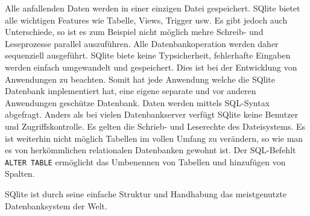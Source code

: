 Alle anfallenden Daten werden in einer einzigen Datei gespeichert. SQlite bietet alle wichtigen Features wie Tabelle, Views, Trigger usw. Es gibt jedoch auch Unterschiede, so ist es zum Beispiel nicht möglich mehre Schreib- und Leseprozesse parallel auszuführen. Alle Datenbankoperation werden daher sequenziell ausgeführt. SQlite biete keine Typsicherheit, fehlerhafte Eingaben werden einfach umgewandelt und gespeichert. Dies ist bei der Entwicklung von Anwendungen zu beachten. Somit hat jede Anwendung welche die SQlite Datenbank implementiert hat, eine eigene separate und vor anderen Anwendungen geschütze Datenbank. Daten werden mittels SQL-Syntax abgefragt. Anders als bei vielen Datenbankserver verfügt SQlite keine Benutzer und Zugriffskontrolle. Es gelten die Schrieb- und Leserechte des Dateisystems. Es ist weiterhin nicht möglich Tabellen im vollen Umfang zu verändern, so wie man es von herkömmlichen relationalen Datenbanken gewohnt ist. Der SQL-Befehlt \verb+ALTER TABLE+ ermöglicht das Umbenennen von Tabellen und hinzufügen von Spalten.

SQlite ist durch seine einfache Struktur und Handhabung das meistgenutzte Datenbanksystem der Welt.
